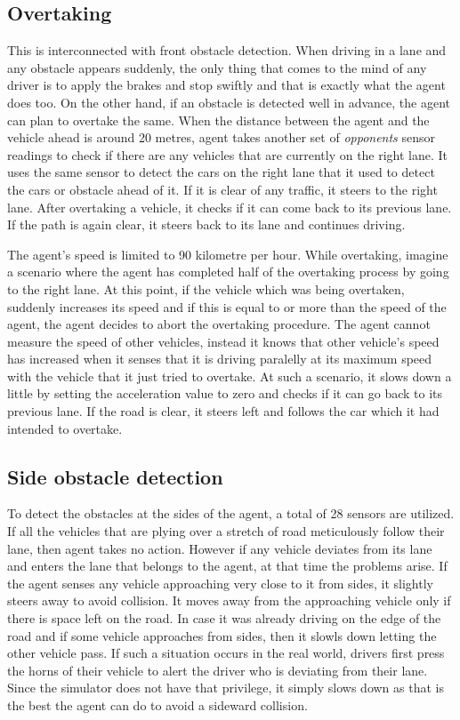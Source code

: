 \subsection{Overtaking}
This is interconnected with front obstacle detection. When driving in a lane and any obstacle appears suddenly, the only thing that comes to the mind of any driver is to apply the brakes and stop swiftly and that is exactly what the agent does too. On the other hand, if an obstacle is detected well in advance, the agent can plan to overtake the same. When the distance between the agent and the vehicle ahead is around 20 metres, agent takes another set of \emph{opponents} sensor readings to check if there are any vehicles that are currently on the right lane. It uses the same sensor to detect the cars on the right lane that it used to detect the cars or obstacle ahead of it. If it is clear of any traffic, it steers to the right lane. After overtaking a vehicle, it checks if it can come back to its previous lane. If the path is again clear, it steers back to its lane and continues driving. 

The agent's speed is limited to 90 kilometre per hour. While overtaking, imagine a scenario where the agent has completed half of the overtaking process by going to the right lane. At this point, if the vehicle which was being overtaken, suddenly increases its speed and if this is equal to or more than the speed of the agent, the agent decides to abort the overtaking procedure. The agent cannot measure the speed of other vehicles, instead it knows that other vehicle's speed has increased when it senses that it is driving paralelly at its maximum speed with the vehicle that it just tried to overtake. At such a scenario, it slows down a little by setting the acceleration value to zero and checks if it can go back to its previous lane. If the road is clear, it steers left and follows the car which it had intended to overtake. 

\subsection{Side obstacle detection}
To detect the obstacles at the sides of the agent, a total of 28 sensors are utilized. If all the vehicles that are plying over a stretch of road meticulously follow their lane, then agent takes no action. However if any vehicle deviates from its lane and enters the lane that belongs to the agent, at that time the problems arise. If the agent senses any vehicle approaching very close to it from sides, it slightly steers away to avoid collision. It moves away from the approaching vehicle only if there is space left on the road. In case it was already driving on the edge of the road and if some vehicle approaches from sides, then it slowls down letting the other vehicle pass. If such a situation occurs in the real world, drivers first press the horns of their vehicle to alert the driver who is deviating from their lane. Since the simulator does not have that privilege, it simply slows down as that is the best the agent can do to avoid a sideward collision.









